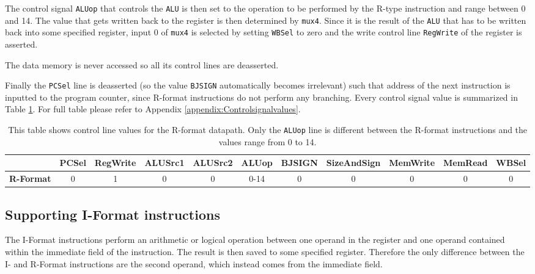         The control signal \texttt{ALUop} that controls the \texttt{ALU} is then set to the operation to be performed by the R-type instruction and range between 0 and 14. The value that gets written back to the register is then determined by \texttt{mux4}. Since it is the result of the \texttt{ALU} that has to be written back into some specified register, input 0 of \texttt{mux4} is selected by setting \texttt{WBSel} to zero and the write control line \texttt{RegWrite} of the register is asserted.
        
        The data memory is never accessed so all its control lines are deasserted.
        
        Finally the \texttt{PCSel} line is deasserted (so the value \texttt{BJSIGN} automatically becomes irrelevant) such that address of the next instruction is inputted to the program counter, since R-format instructions do not perform any branching. Every control signal value is summarized in Table \ref{table:RFORMAT}. For full table please refer to Appendix \ref{appendix:Controlsignalvalues}.
        
        \begin{table}[h!]
            \small
            \hspace{-2.4cm}
            \begin{tabular}{|c||c|c|c|c|c|c|c|c|c|c|}
            	\hline
            	                  & \textbf{PCSel} & \textbf{RegWrite} & \textbf{ALUSrc1} & \textbf{ALUSrc2} & \textbf{ALUop} & \textbf{BJSIGN} & \textbf{SizeAndSign} & \textbf{MemWrite} & \textbf{MemRead} & \textbf{WBSel} \\ \hline\hline
            	\textbf{R-Format} &       0        &         1         &        0         &        0         &      0-14      &        0        &          0           &         0         &        0         &       0        \\ \hline
            \end{tabular}
            \caption{This table shows control line values for the R-format datapath. Only the \texttt{ALUop} line is different between the R-format instructions and the values range from 0 to 14.}
            \label{table:RFORMAT}
        \end{table}
    
    \subsection{Supporting I-Format instructions}
        The I-Format instructions perform an arithmetic or logical operation between one operand in the register and one operand contained within the immediate field of the instruction. The result is then saved to some specified register. Therefore the only difference between the I- and R-Format instructions are the second operand, which instead comes from the immediate field. 
        
